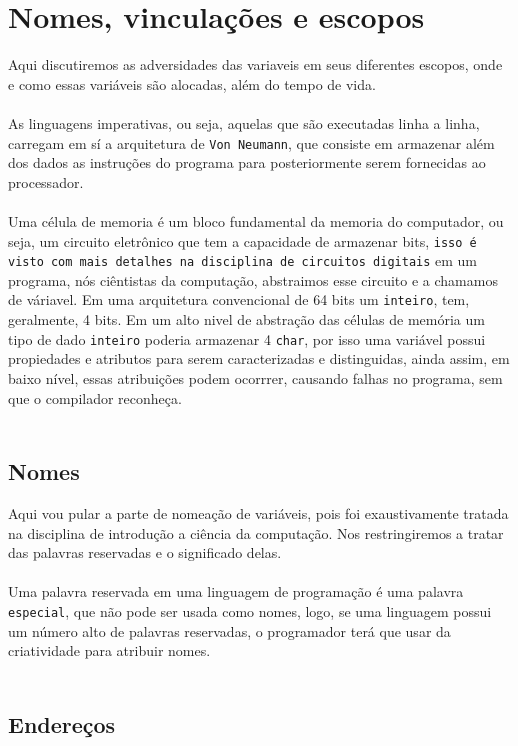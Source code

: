 \documentclass[12pt, onecolumn]{article}
\begin{document}
	\section{Nomes, vinculações e escopos}
	Aqui discutiremos as adversidades das variaveis em seus diferentes escopos, 
	onde e como essas variáveis são alocadas, além do tempo de vida.\\
	\\
	As linguagens imperativas, ou seja, aquelas que são executadas linha a linha,
	carregam em sí a arquitetura de \texttt{Von Neumann}, que consiste em 
	armazenar além dos dados as instruções do programa para posteriormente 
	serem fornecidas ao processador.\\
	\\
	Uma célula de memoria é um bloco fundamental da memoria do computador, ou seja,
	um circuito eletrônico que tem a capacidade de armazenar bits, 
	\texttt{isso é visto com mais detalhes na disciplina de circuitos digitais} em
	um programa, nós ciêntistas da computação, abstraimos esse circuito e a 
	chamamos de váriavel. Em uma arquitetura convencional de 64 bits um 
	\texttt{inteiro}, tem, geralmente, 4 bits. Em um alto nivel de abstração das
	células de memória um tipo de dado \texttt{inteiro} poderia armazenar 4 
	\texttt{char}, por isso uma variável possui propiedades e atributos para
	serem caracterizadas e distinguidas, ainda assim, em baixo nível, essas 
	atribuições podem ocorrrer, causando falhas no programa, sem que o compilador 
	reconheça.\\
	\\

		\subsection{Nomes}
	Aqui vou pular a parte de nomeação de variáveis, pois foi exaustivamente
	tratada na disciplina de introdução a ciência da computação. Nos restringiremos
	a tratar das palavras reservadas e o significado delas.\\
	\\
	Uma palavra reservada em uma linguagem de programação é uma palavra 
	\texttt{especial}, que não pode ser usada como nomes, logo, se uma
	linguagem possui um número alto de palavras reservadas, o programador
	terá que usar da criatividade para atribuir nomes.\\
	\\
		\subsection{Endereços}
	
\end{document}
